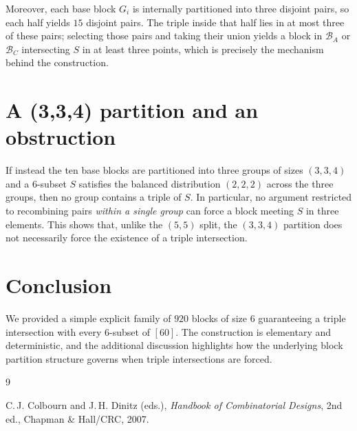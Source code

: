 \documentclass[11pt]{article}
\begin{document}
Moreover, each base block $G_i$ is internally partitioned into three disjoint pairs, so each half
yields $15$ disjoint pairs. The triple inside that half lies in at most three of these pairs; selecting
those pairs and taking their union yields a block in $\mathcal{B}_A$ or $\mathcal{B}_C$ intersecting
$S$ in at least three points, which is precisely the mechanism behind the construction.

\section{A (3,3,4) partition and an obstruction}
If instead the ten base blocks are partitioned into three groups of sizes $(3,3,4)$ and a $6$-subset
$S$ satisfies the balanced distribution $(2,2,2)$ across the three groups, then no group contains a
triple of $S$. In particular, no argument restricted to recombining pairs \emph{within a single group}
can force a block meeting $S$ in three elements. This shows that, unlike the $(5,5)$ split, the
$(3,3,4)$ partition does not necessarily force the existence of a triple intersection.

\section{Conclusion}
We provided a simple explicit family of $920$ blocks of size $6$ guaranteeing a triple intersection
with every $6$-subset of $[60]$. The construction is elementary and deterministic, and the additional
discussion highlights how the underlying block partition structure governs when triple intersections
are forced.

\begin{thebibliography}{9}

C.\,J. Colbourn and J.\,H. Dinitz (eds.),
\emph{Handbook of Combinatorial Designs}, 2nd ed.,
Chapman \& Hall/CRC, 2007.

\end{thebibliography}
\end{document}
